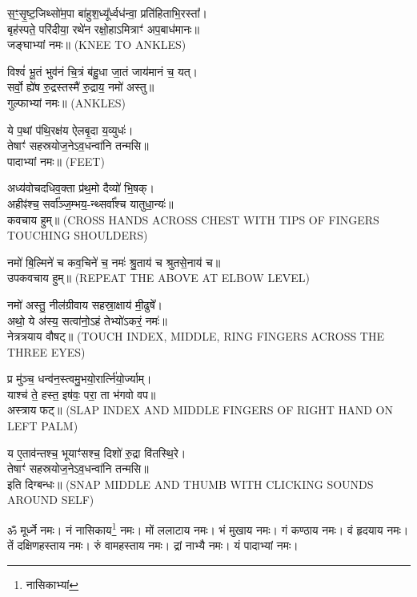 स॒ꣳ॒सृ॒ष्ट॒जिथ्सो॑म॒पा बा॑हुश॒ध्यू᳚र्ध्वध॑न्वा॒ प्रति॑हिताभि॒रस्ता᳚।\\
बृह॑स्पते॒ परि॑दीया॒ रथे॑न रक्षो॒हाऽमित्राꣳ॑ अप॒बाध॑मानः॥\\
जङ्घाभ्यां नमः॥ {\scriptsize (KNEE TO ANKLES)}

विश्वं॑ भू॒तं भुव॑नं चि॒त्रं ब॑हु॒धा जा॒तं जाय॑मानं च॒ यत्।\\
सर्वो॒ ह्ये॑ष रु॒द्रस्तस्मै॑ रु॒द्राय॒ नमो॑ अस्तु॥\\
गुल्फाभ्यां नमः॥ {\scriptsize (ANKLES)}

ये प॒थां प॑थि॒रक्ष॑य ऐलबृ॒दा य॒व्युधः॑।\\
तेषाꣳ॑ सहस्रयोज॒नेऽव॒धन्वा॑नि तन्मसि॥\\
पादाभ्यां नमः॥ {\scriptsize (FEET)}

अध्य॑वोचदधिव॒क्ता प्र॑थ॒मो दैव्यो॑ भि॒षक्।\\
अहीꣴ॑श्च॒ सर्वा᳚ञ्ज॒म्भय॒-न्थ्सर्वा᳚श्च यातुधा॒न्यः॑॥\\
कवचाय हुम्॥ {\scriptsize (CROSS HANDS ACROSS CHEST WITH TIPS OF FINGERS TOUCHING SHOULDERS)}

नमो॑ बि॒ल्मिने॑ च कव॒चिने॑ च॒ नमः॑ श्रु॒ताय॑ च श्रुतसे॒नाय॑ च॥\\
उपकवचाय हुम्॥ {\scriptsize (REPEAT THE ABOVE AT ELBOW LEVEL)}

नमो॑ अस्तु॒ नील॑ग्रीवाय सहस्रा॒क्षाय॑ मी॒ढुषे᳚।\\
अथो॒ ये अ॑स्य॒ सत्वा॑नो॒ऽहं तेभ्यो॑ऽकरं॒ नमः॑॥\\
नेत्रत्रयाय वौषट्॥ {\scriptsize (TOUCH INDEX, MIDDLE, RING FINGERS ACROSS THE THREE EYES)}

प्र मु॑ञ्च॒ धन्व॑न॒स्त्वमु॒भयो॒रार्त्नि॑यो॒र्ज्याम्।\\
याश्च॑ ते॒ हस्त॒ इष॑वः॒ परा॒ ता भ॑गवो वप॥\\
अस्त्राय फट्॥ {\scriptsize (SLAP INDEX AND MIDDLE FINGERS OF RIGHT HAND ON LEFT PALM)}

य ए॒ताव॑न्तश्च॒ भूयाꣳ॑सश्च॒ दिशो॑ रु॒द्रा वि॑तस्थि॒रे।\\
तेषाꣳ॑ सहस्रयोज॒नेऽव॒धन्वा॑नि तन्मसि॥\\
इति दिग्बन्धः॥ {\scriptsize (SNAP MIDDLE AND THUMB WITH CLICKING SOUNDS AROUND SELF)}

{\small\closesection}

ॐ मूर्ध्ने नमः। नं नासिकाय\footnote{नासिकाभ्यां} नमः। मों ललाटाय नमः। भं मुखाय नमः। गं कण्ठाय नमः। वं हृदयाय नमः। तें दक्षिणहस्ताय नमः। रुं वामहस्ताय नमः। द्रां नाभ्यै नमः। यं पादाभ्यां नमः।

